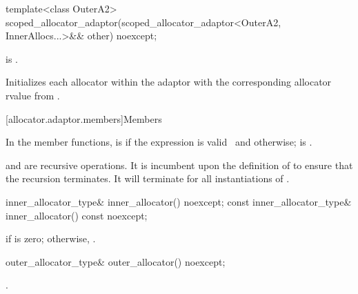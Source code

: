 %
\begin{itemdecl}
template<class OuterA2>
  scoped_allocator_adaptor(scoped_allocator_adaptor<OuterA2, InnerAllocs...>&& other) noexcept;
\end{itemdecl}

\begin{itemdescr}
\pnum
\constraints
{} is .

\pnum
\effects
Initializes each allocator within the adaptor with the corresponding allocator rvalue
from .
\end{itemdescr}

[allocator.adaptor.members]{Members}

\pnum
In the  member functions,
 is
 if
the expression  is
valid~ and
 otherwise;
 is
.
\begin{note}
 and
 are recursive operations. It
is incumbent upon the definition of  to ensure that the
recursion terminates. It will terminate for all instantiations of
.
\end{note}

%
\begin{itemdecl}
inner_allocator_type& inner_allocator() noexcept;
const inner_allocator_type& inner_allocator() const noexcept;
\end{itemdecl}

\begin{itemdescr}
\pnum
\returns
{} if  is zero; otherwise,
.
\end{itemdescr}

%
\begin{itemdecl}
outer_allocator_type& outer_allocator() noexcept;
\end{itemdecl}

\begin{itemdescr}
\pnum
\returns
{}.
\end{itemdescr}

